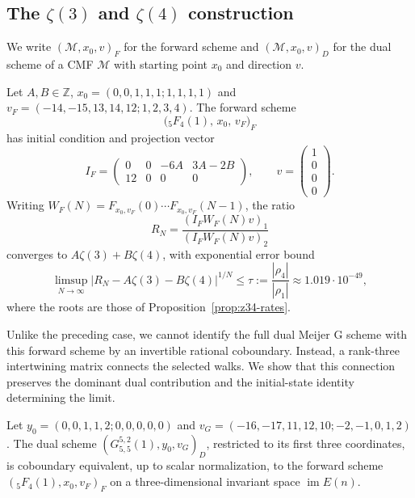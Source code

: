 \subsection{The \(\zeta(3)\) and \(\zeta(4)\) construction}

We write $(\mathcal M,x_0,v)_F$ for the forward scheme and
$(\mathcal M,x_0,v)_D$ for the dual scheme of a CMF $\mathcal M$ with
starting point $x_0$ and direction $v$.

\begin{theorem}
\label{thm:z34-limit}
Let $A,B\in\mathbb Z$, $x_0=(0,0,1,1,1;1,1,1,1)$ and
$v_F=(-14,-15,13,14,12;1,2,3,4)$.
The forward scheme
\[
\bigl({}_5F_4(1),\,x_0,\,v_F\bigr)_F
\]
has initial condition and projection vector
\[
I_F=\begin{pmatrix}0&0&-6A&3A-2B\\12&0&0&0\end{pmatrix},
\qquad v=\begin{pmatrix}1\\0\\0\\0\end{pmatrix}.
\]
Writing $W_F(N)=F_{x_0,v_F}(0)\cdots F_{x_0,v_F}(N-1)$, the ratio
\[
R_N=\frac{(I_FW_F(N)v)_1}{(I_FW_F(N)v)_2}
\]
converges to $A\zeta(3)+B\zeta(4)$, with exponential error bound
\[
\limsup_{N\to\infty}|R_N-A\zeta(3)-B\zeta(4)|^{1/N}
\leq\tau:=\frac{|\rho_4|}{|\rho_1|}
\approx1.019\cdot10^{-49},
\]
where the roots are those of Proposition~\ref{prop:z34-rates}.
\end{theorem}
Unlike the preceding case, we cannot identify the full dual Meijer G
scheme with this forward scheme by an invertible rational coboundary.
Instead, a rank-three intertwining matrix connects the selected walks.
We show that this connection preserves the dominant dual contribution
and the initial-state identity determining the limit.

\begin{proposition}
\label{prop:z34-coboundary}
Let $y_0=(0,0,1,1,2;0,0,0,0,0)$ and
$v_G=(-16,-17,11,12,10;-2,-1,0,1,2)$.
The dual scheme $(G^{5,2}_{5,5}(1),y_0,v_G)_D$, restricted to its first
three coordinates, is coboundary equivalent, up to scalar normalization,
to the forward scheme $({}_5F_4(1),x_0,v_F)_F$ on a three-dimensional
invariant space $\operatorname{im}E(n)$.
\end{proposition}

